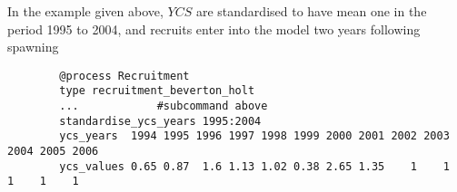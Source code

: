 In the  example given above,  $YCS$ are standardised to have mean one in the period 1995 to 2004, and recruits enter into the model two years following spawning

{\small{\begin{verbatim}
		@process Recruitment
		type recruitment_beverton_holt
		...            #subcommand above
		standardise_ycs_years 1995:2004
		ycs_years  1994 1995 1996 1997 1998 1999 2000 2001 2002 2003 2004 2005 2006
		ycs_values 0.65 0.87  1.6 1.13 1.02 0.38 2.65 1.35    1    1    1    1    1
		\end{verbatim}}}


